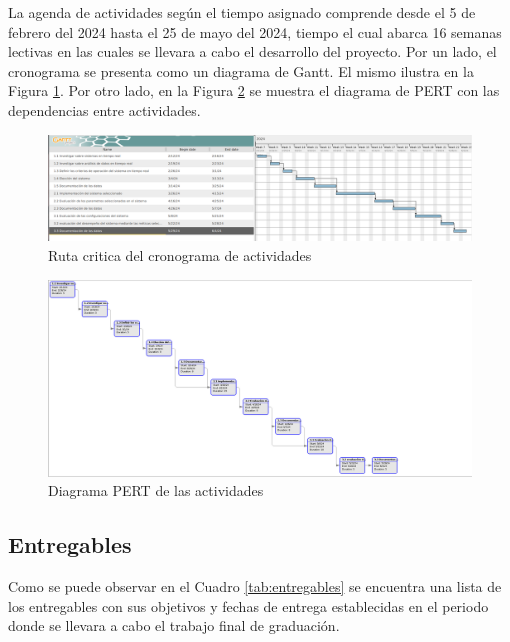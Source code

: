 \documentclass[12pt]{article}
\begin{document}
La agenda de actividades según el tiempo asignado comprende desde el  5 de febrero del 2024 hasta el 25 de mayo del 2024, tiempo el cual abarca 16 semanas lectivas en las cuales se llevara a cabo el desarrollo del proyecto. Por un lado, el cronograma se presenta como un diagrama de Gantt. El mismo ilustra en la Figura \ref{fig:gantt}. Por otro lado, en la Figura \ref{fig:pert} se muestra el diagrama de PERT con las dependencias entre actividades.

\newpage

\begin{figure}
  \centering
  \includegraphics[scale=0.3, angle=90]{diagramas/gantt.png}
  \caption{Ruta critica del cronograma de actividades}
  \label{fig:gantt}
\end{figure}

\begin{figure}
  \centering
  \includegraphics[scale=0.3, angle=90]{diagramas/pert.png}
  \caption{Diagrama PERT de las actividades}
  \label{fig:pert}
\end{figure}


\subsection{Entregables}

Como se puede observar en el Cuadro \ref{tab:entregables} se encuentra una lista de los entregables con sus objetivos y fechas de entrega establecidas en el periodo donde se llevara a cabo el trabajo final de graduación.
\end{document}
